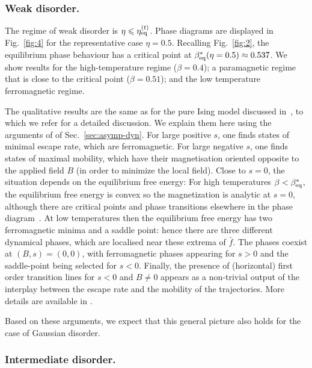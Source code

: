 \documentclass{iopart}
\begin{document}
\subsubsection{Weak disorder.}\label{sec:small_dis}


The regime of weak disorder is $\eta \leqslant \eta_{\rm eq}^{(t)}$.  Phase diagrams are displayed in Fig.~\ref{fig:4} for the representative case $\eta=0.5$.   Recalling Fig.~\ref{fig:2}, the equilibrium phase behaviour has a critical point at $\beta_{\rm eq}^{\ast}(\eta = 0.5) \approx 0.537$.  We show results for  the high-temperature regime ($\beta=0.4$); a paramagnetic regime that is close to the critical point ($\beta=0.51$); and the low temperature ferromagnetic regime.

The qualitative results are the same as for the pure Ising model discussed in~\cite{GuiothJack2020}, to which we refer for a detailed discussion.  We explain them here using the arguments of of Sec.~\ref{sec:asymp-dyn}.  For large positive $s$, one finds states of minimal escape rate, which are ferromagnetic.  For large negative $s$, one finds states of maximal mobility, which have their magnetisation oriented opposite to the applied field $B$ (in order to minimize the local field).  Close to $s=0$, the situation depends on the equilibrium free energy: For high temperatures $\beta<\beta_{\rm eq}^{\ast}$, the equilibrium free energy is convex so the magnetization is analytic at $s=0$, although there are critical points and phase transitions elsewhere in the phase diagram~\cite{GuiothJack2020}.  At low temperatures then the equilibrium free energy has two ferromagnetic minima and a saddle point: hence there are three different dynamical phases, which are localised near these extrema of $\bar f$.  The phases coexist at $(B,s)=(0,0)$, with ferromagnetic phases appearing for $s>0$ and the saddle-point being selected for $s<0$.
{Finally, the presence of (horizontal) first order transition lines for $s<0$ and  $B\neq 0$ appears as a non-trivial output of the interplay between the escape rate and the mobility of the trajectories. More details are available in \cite{GuiothJack2020}.}

Based on these arguments, we expect that this general picture also holds for the case of Gaussian disorder.

\subsubsection{Intermediate disorder.}
\label{sec:inter_dis_activity}
\end{document}
